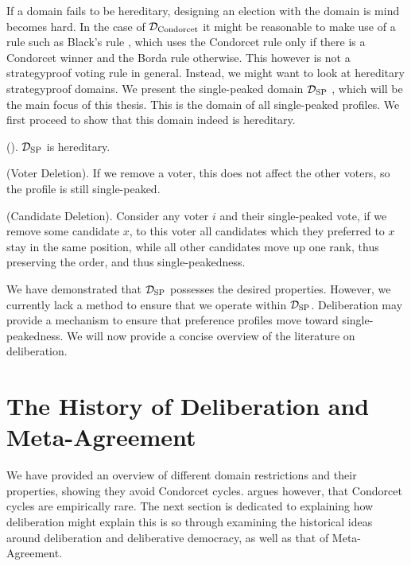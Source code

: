If a domain fails to be hereditary, designing an election with the domain is
mind becomes hard. In the case of $\mathcal{D}_{\textnormal{Condorcet}}$ it might be reasonable
to make use of a rule such as Black's rule
\cite{blackRationaleGroupDecisionmaking1948}, which uses the Condorcet rule
only if there is a Condorcet winner and the Borda rule otherwise. This however
is not a strategyproof voting rule in general. Instead, we might want to look
at hereditary strategyproof domains. We present the single-peaked domain $\mathcal{D}_{\textnormal{SP}}$ , which
will be the main focus of this thesis. This is the domain of all single-peaked
profiles. We first proceed to show that this domain indeed is hereditary.


\begin{proposition}{\textnormal{(\citet{elkindPreferenceRestrictionsComputational2022}).}}
	$\mathcal{D}_{\textnormal{SP}}$ is hereditary.
\end{proposition}

\begin{proofc}
	(Voter Deletion). If we remove a voter, this does not affect the other voters, so the profile is still single-peaked.~\checkmark

	(Candidate Deletion). Consider any voter $i$ and their single-peaked
	vote, if we remove some candidate $x$, to this voter all candidates which they preferred to $x$ stay in the same position, while all other candidates move
	up one rank, thus preserving the order, and thus single-peakedness.~\checkmark
\end{proofc}


We have demonstrated that $\mathcal{D}_{\textnormal{SP}}$ possesses the desired properties.
However, we currently lack a method to ensure that we operate within
$\mathcal{D}_{\textnormal{SP}}$. Deliberation may provide a mechanism to ensure that preference
profiles move toward single-peakedness. We will now provide a concise
overview of the literature on deliberation.

\section{The History of Deliberation and Meta-Agreement}

We have provided an overview of different domain restrictions and their
properties, showing they avoid Condorcet cycles.
\citet{bochslerMarquisCondorcetGoes2010} argues however, that Condorcet cycles
are empirically rare. The next section is dedicated to explaining how
deliberation might explain this is so through examining the historical ideas
around deliberation and deliberative democracy, as well as that of
Meta-Agreement.

